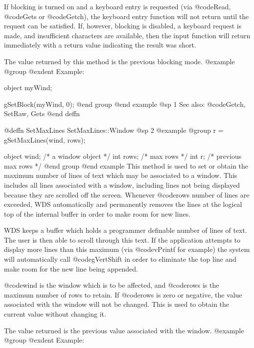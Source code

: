 If blocking is turned on and a keyboard entry is requested (via
@code{Read}, @code{Gets} or @code{Getch}), the keyboard entry function
will not return until the request can be satisfied.  If, however,
blocking is disabled, a keyboard request is made, and insufficient
characters are available, then the input function will return immediately
with a return value indicating the result was short.

The value returned by this method is the previous blocking mode.
@example
@group
@exdent Example:

object  myWind;

gSetBlock(myWind, 0);
@end group
@end example
@sp 1
See also:  @code{Getch, SetRaw, Gets}
@end deffn















@deffn {SetMaxLines} SetMaxLines::Window
@sp 2
@example
@group
r = gSetMaxLines(wind, rows);

object  wind;   /*  a window object     */
int     rows;   /*  max rows            */
int     r;      /*  previous max rows   */
@end group
@end example
This method is used to set or obtain the maximum number of lines of text
which may be associated to a window.  This includes all lines associated
with a window, including lines not being displayed because they are
scrolled off the screen.  Whenever @code{rows} number of lines are
exceeded, WDS automatically and permanently removes the lines at the
logical top of the internal buffer in order to make room for new
lines.

WDS keeps a buffer which holds a programmer definable number of lines of
text.  The user is then able to scroll through this text.  If the
application attempts to display more lines than this maximum (via
@code{vPrintf} for example) the system will automatically call
@code{gVertShift} in order to eliminate the top line and make room for
the new line being appended.

@code{wind} is the window which is to be affected, and @code{rows} is the
maximum number of rows to retain.  If @code{rows} is zero or negative,
the value associated with the window will not be changed.  This is used
to obtain the current value without changing it.

The value returned is the previous value associated with the window.
@example
@group
@exdent Example:


